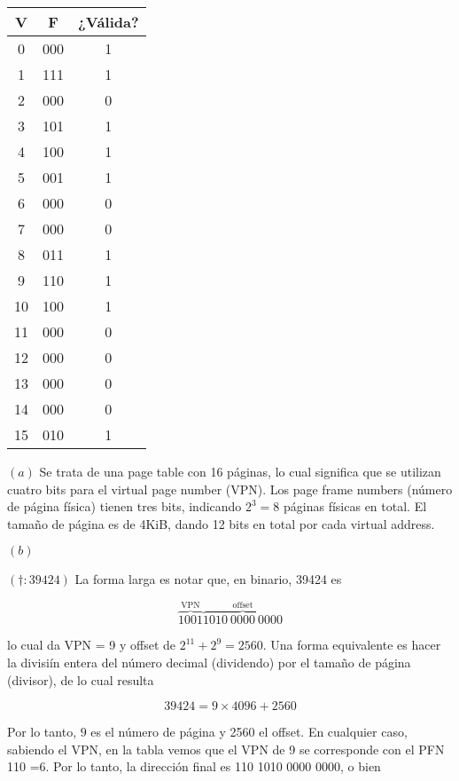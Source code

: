 \documentclass[12pt]{article}
\theoremstyle{definition}
\begin{document}
    \begin{table}[h]
\centering
\begin{tabular}{|c|c|c|}
\hline
V & F   & ¿Válida? \\ \hline
0  & 000 & 1 \\ \hline
1  & 111 & 1 \\ \hline
2  & 000 & 0 \\ \hline
3  & 101 & 1 \\ \hline
4  & 100 & 1 \\ \hline
5  & 001 & 1 \\ \hline
6  & 000 & 0 \\ \hline
7  & 000 & 0 \\ \hline
8  & 011 & 1 \\ \hline
9  & 110 & 1 \\ \hline
10 & 100 & 1 \\ \hline
11 & 000 & 0 \\ \hline
12 & 000 & 0 \\ \hline
13 & 000 & 0 \\ \hline
14 & 000 & 0 \\ \hline
15 & 010 & 1 \\ \hline
\end{tabular}
\end{table}

$(a)$ Se trata de una page table con 16 páginas, lo cual significa que se
utilizan cuatro bits para el virtual page number (VPN). Los page frame numbers
(número de página física) tienen tres bits, indicando $2^3 = 8$ páginas físicas
en total. El tamaño de página es de 4KiB, dando 12 bits en total por cada
virtual address.

$(b)$

$(\dagger: 39424)$ La forma larga es notar que, en binario, 39424 es 

\begin{equation*}
    \overbrace{1001}^{\text{VPN}}\overbrace{1010 ~ 0000 ~ 0000}^{\text{offset}}
\end{equation*}

lo cual da VPN = 9 y offset de $2^{11} + 2^{9} = 2560$. Una forma equivalente es
hacer la divisiín entera del número decimal (dividendo) por el tamaño de página
(divisor), de lo cual resulta 

\begin{equation*}
    39424 = 9 \times 4096 + 2560
\end{equation*}
 
Por lo tanto, $9$ es el número de página y 2560 el offset. En cualquier caso,
sabiendo el VPN, en la tabla vemos que el VPN de 9 se corresponde con el PFN
110 =6. Por lo tanto, la dirección final es 110 1010 0000 0000, o bien 
\end{document}
